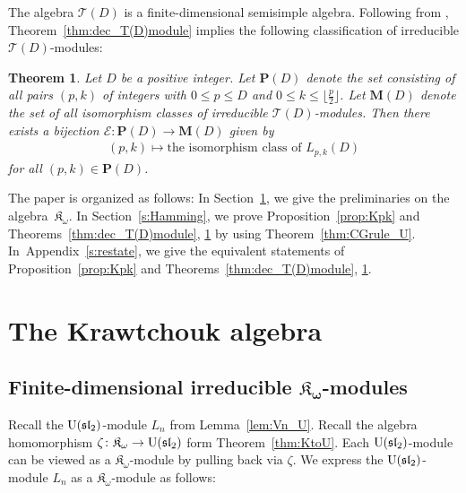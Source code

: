 \documentclass[pdftex]{sigma}%
\def\K{\mathfrak K_\omega}
\def\T{\mathcal T}
\def\U{{\rm U}(\mathfrak{sl}_2)}
\numberwithin{equation}{section}
\newtheorem{Theorem}{Theorem}[section]
\begin{document}
The algebra $\T(D)$ is a finite-dimensional semisimple algebra. Following from \cite[Theorem~25.10]{Wedderburn1962}, Theorem~\ref{thm:dec_T(D)module} implies the following classification of irreducible $\T(D)$-modules:

\begin{Theorem}\label{thm:T(D)irrmodule}
Let $D$ be a positive integer. Let $\mathbf P(D)$ denote the set consisting of all pairs $(p,k)$ of integers with $0\leq p\leq D$ and $0\leq k\leq \big\lfloor \frac{p}{2}\big\rfloor$. Let $\mathbf M(D)$ denote the set of all isomorphism classes of irreducible $\T(D)$-modules. Then there exists a bijection $\mathcal E\colon \mathbf P(D)\to \mathbf M(D)$ given by
\begin{gather*}
(p,k) \mapsto \text{the isomorphism class of $L_{p,k}(D)$}
\end{gather*}
for all $(p,k)\in \mathbf P(D)$.
\end{Theorem}

The paper is organized as follows:
In Section~\ref{s:Hopf}, we give the preliminaries on the algebra~$\K$.
In Section~\ref{s:Hamming}, we prove Proposition~\ref{prop:Kpk} and Theorems~\ref{thm:dec_T(D)module}, \ref{thm:T(D)irrmodule} by using Theorem~\ref{thm:CGrule_U}.
In~Appendix~\ref{s:restate}, we give the equivalent statements of Proposition~\ref{prop:Kpk} and Theorems~\ref{thm:dec_T(D)module}, \ref{thm:T(D)irrmodule}.


\section{The Krawtchouk algebra}\label{s:Hopf}

\subsection[Finite-dimensional irreducible K\_w-modules]{Finite-dimensional irreducible $\boldsymbol{\K}$-modules}

Recall the $\U$-module $L_n$ from Lemma~\ref{lem:Vn_U}.
Recall the algebra homomorphism $\zeta\colon \K\to \U$ form Theorem~\ref{thm:KtoU}.
Each $\U$-module can be viewed as a $\K$-module by pulling back via $\zeta$.
We express the $\U$-module $L_n$ as a $\K$-module as follows:
\end{document}

